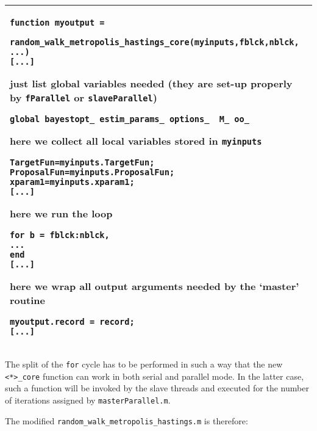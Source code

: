 \documentclass[12pt,a4paper,pdftex]{article}
\begin{document}
\singlespacing
{\footnotesize
\noindent\begin{tabular}[b]{| p{\linewidth} |}
\hline
\begin{verbatim}
function myoutput =
    random_walk_metropolis_hastings_core(myinputs,fblck,nblck, ...)
[...]
\end{verbatim}
just list global variables needed (they are set-up properly by \verb"fParallel" or \verb"slaveParallel")
\begin{verbatim}
global bayestopt_ estim_params_ options_  M_ oo_
\end{verbatim}
here we collect all local variables stored in \verb"myinputs"
\begin{verbatim}
TargetFun=myinputs.TargetFun;
ProposalFun=myinputs.ProposalFun;
xparam1=myinputs.xparam1;
[...]
\end{verbatim}
here we run the loop
\begin{verbatim}
for b = fblck:nblck,
...
end
[...]
\end{verbatim}
here we wrap all output arguments needed by the `master' routine
\begin{verbatim}
myoutput.record = record;
[...]
\end{verbatim}
\\ \hline
\end{tabular}
}
\doublespacing
The split of the \verb"for" cycle has to be performed in such a way that the new \verb"<*>_core" function can work in both serial and parallel mode. In the latter case, such a function will be invoked by the slave threads and executed for the number of iterations assigned by \verb"masterParallel.m".

The modified \verb"random_walk_metropolis_hastings.m" is therefore:
\end{document}
